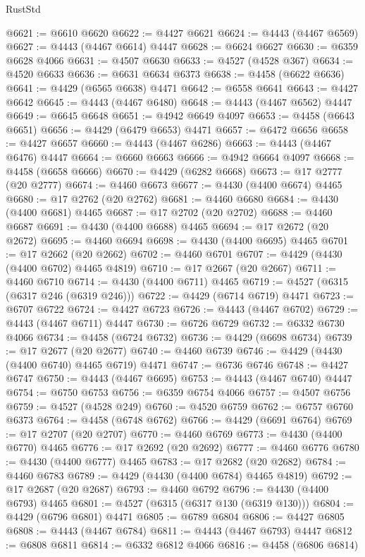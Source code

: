 \begin{lexlean}{RustStd}
\begin{coremodule}
{\begin{coremodule}
{{{{{{{{{{{{{{{{{{{{{{{{{{{{{{{{{{{{{{{{{{{{{{{{{{{{{{{{{{{{{{{{{{{{@6621 := @6610 @6620
@6622 := @4427 @6621
@6624 := @4443 (@4467 @6569)
@6627 := @4443 (@4467 @6614) @4447
@6628 := @6624 @6627
@6630 := @6359 @6628 @4066
@6631 := @4507 @6630
@6633 := @4527 (@4528 @367)
@6634 := @4520 @6633
@6636 := @6631 @6634 @6373
@6638 := @4458 (@6622 @6636)
@6641 := @4429 (@6565 @6638) @4471
@6642 := @6558 @6641
@6643 := @4427 @6642
@6645 := @4443 (@4467 @6480)
@6648 := @4443 (@4467 @6562) @4447
@6649 := @6645 @6648
@6651 := @4942 @6649 @4097
@6653 := @4458 (@6643 @6651)
@6656 := @4429 (@6479 @6653) @4471
@6657 := @6472 @6656
@6658 := @4427 @6657
@6660 := @4443 (@4467 @6286)
@6663 := @4443 (@4467 @6476) @4447
@6664 := @6660 @6663
@6666 := @4942 @6664 @4097
@6668 := @4458 (@6658 @6666)
@6670 := @4429 (@6282 @6668)
@6673 := @17 @2777 (@20 @2777)
@6674 := @4460 @6673
@6677 := @4430 (@4400 @6674) @4465
@6680 := @17 @2762 (@20 @2762)
@6681 := @4460 @6680
@6684 := @4430 (@4400 @6681) @4465
@6687 := @17 @2702 (@20 @2702)
@6688 := @4460 @6687
@6691 := @4430 (@4400 @6688) @4465
@6694 := @17 @2672 (@20 @2672)
@6695 := @4460 @6694
@6698 := @4430 (@4400 @6695) @4465
@6701 := @17 @2662 (@20 @2662)
@6702 := @4460 @6701
@6707 := @4429 (@4430 (@4400 @6702) @4465 @4819)
@6710 := @17 @2667 (@20 @2667)
@6711 := @4460 @6710
@6714 := @4430 (@4400 @6711) @4465
@6719 := @4527 (@6315 (@6317 @246 (@6319 @246)))
@6722 := @4429 (@6714 @6719) @4471
@6723 := @6707 @6722
@6724 := @4427 @6723
@6726 := @4443 (@4467 @6702)
@6729 := @4443 (@4467 @6711) @4447
@6730 := @6726 @6729
@6732 := @6332 @6730 @4066
@6734 := @4458 (@6724 @6732)
@6736 := @4429 (@6698 @6734)
@6739 := @17 @2677 (@20 @2677)
@6740 := @4460 @6739
@6746 := @4429 (@4430 (@4400 @6740) @4465 @6719) @4471
@6747 := @6736 @6746
@6748 := @4427 @6747
@6750 := @4443 (@4467 @6695)
@6753 := @4443 (@4467 @6740) @4447
@6754 := @6750 @6753
@6756 := @6359 @6754 @4066
@6757 := @4507 @6756
@6759 := @4527 (@4528 @249)
@6760 := @4520 @6759
@6762 := @6757 @6760 @6373
@6764 := @4458 (@6748 @6762)
@6766 := @4429 (@6691 @6764)
@6769 := @17 @2707 (@20 @2707)
@6770 := @4460 @6769
@6773 := @4430 (@4400 @6770) @4465
@6776 := @17 @2692 (@20 @2692)
@6777 := @4460 @6776
@6780 := @4430 (@4400 @6777) @4465
@6783 := @17 @2682 (@20 @2682)
@6784 := @4460 @6783
@6789 := @4429 (@4430 (@4400 @6784) @4465 @4819)
@6792 := @17 @2687 (@20 @2687)
@6793 := @4460 @6792
@6796 := @4430 (@4400 @6793) @4465
@6801 := @4527 (@6315 (@6317 @130 (@6319 @130)))
@6804 := @4429 (@6796 @6801) @4471
@6805 := @6789 @6804
@6806 := @4427 @6805
@6808 := @4443 (@4467 @6784)
@6811 := @4443 (@4467 @6793) @4447
@6812 := @6808 @6811
@6814 := @6332 @6812 @4066
@6816 := @4458 (@6806 @6814)
}}}}}}}}}}}}}}}}}}}}}}}}}}}}}}}}}}}}}}}}}}}}}}}}}}}}}}}}}}}}}}}}}}}}
\end{coremodule}}
\end{coremodule}
\end{lexlean}
